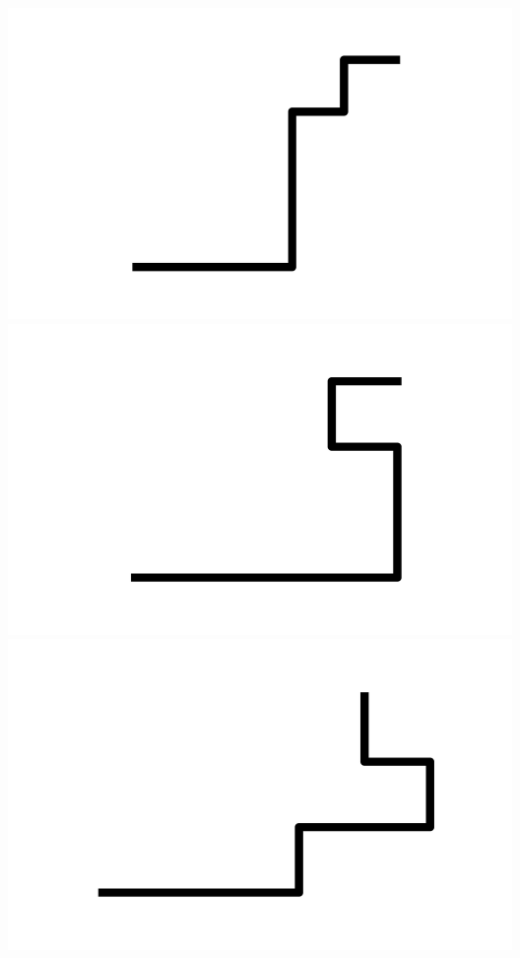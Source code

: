 \documentclass[]{report}
\begin{document}
\includegraphics[scale=.1]{pictures/21/state_cluster_shapes_136.pdf} 
\includegraphics[scale=.1]{pictures/21/state_cluster_shapes_137.pdf} 
\includegraphics[scale=.1]{pictures/21/state_cluster_shapes_138.pdf} 
\end{document}
